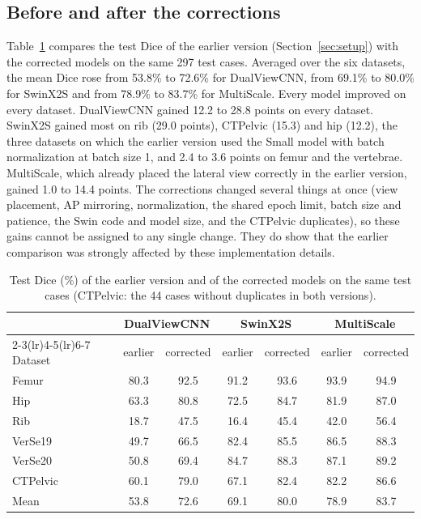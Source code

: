 \documentclass[11pt]{article}
\begin{document}
\subsection{Before and after the corrections}\label{sec:beforeafter}
Table~\ref{tab:beforeafter} compares the test Dice of the earlier version (Section~\ref{sec:setup}) with the corrected models on the same 297 test cases. Averaged over the six datasets, the mean Dice rose from 53.8\% to 72.6\% for DualViewCNN, from 69.1\% to 80.0\% for SwinX2S and from 78.9\% to 83.7\% for MultiScale. Every model improved on every dataset. DualViewCNN gained 12.2 to 28.8 points on every dataset. SwinX2S gained most on rib (29.0 points), CTPelvic (15.3) and hip (12.2), the three datasets on which the earlier version used the Small model with batch normalization at batch size 1, and 2.4 to 3.6 points on femur and the vertebrae. MultiScale, which already placed the lateral view correctly in the earlier version, gained 1.0 to 14.4 points. The corrections changed several things at once (view placement, AP mirroring, normalization, the shared epoch limit, batch size and patience, the Swin code and model size, and the CTPelvic duplicates), so these gains cannot be assigned to any single change. They do show that the earlier comparison was strongly affected by these implementation details.

\begin{table}[t]
\centering
\caption{Test Dice (\%) of the earlier version and of the corrected models on the same test cases (CTPelvic: the 44 cases without duplicates in both versions).}
\label{tab:beforeafter}
\small
\setlength{\tabcolsep}{4pt}
\begin{tabular}{@{}lcccccc@{}}
\toprule
 & \multicolumn{2}{c}{DualViewCNN} & \multicolumn{2}{c}{SwinX2S} & \multicolumn{2}{c}{MultiScale} \\
\cmidrule(lr){2-3}\cmidrule(lr){4-5}\cmidrule(lr){6-7}
Dataset & earlier & corrected & earlier & corrected & earlier & corrected \\
\midrule
Femur & 80.3 & 92.5 & 91.2 & 93.6 & 93.9 & 94.9 \\
Hip & 63.3 & 80.8 & 72.5 & 84.7 & 81.9 & 87.0 \\
Rib & 18.7 & 47.5 & 16.4 & 45.4 & 42.0 & 56.4 \\
VerSe19 & 49.7 & 66.5 & 82.4 & 85.5 & 86.5 & 88.3 \\
VerSe20 & 50.8 & 69.4 & 84.7 & 88.3 & 87.1 & 89.2 \\
CTPelvic & 60.1 & 79.0 & 67.1 & 82.4 & 82.2 & 86.6 \\
\midrule
Mean & 53.8 & 72.6 & 69.1 & 80.0 & 78.9 & 83.7 \\
\bottomrule
\end{tabular}
\end{table}
\end{document}
